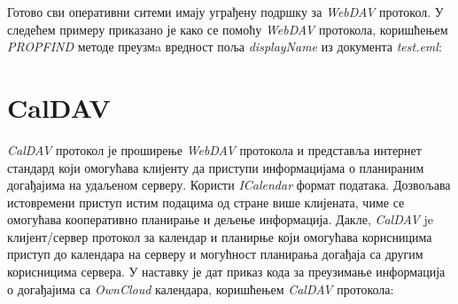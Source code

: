 Готово сви оперативни ситеми имају уграђену подршку за \textit{WebDAV} протокол. У следећем примеру приказано је како се помоћу \textit{WebDAV} протокола, коришћењем \textit{PROPFIND} методе преузмa вредност поља \textit{displayName} из документа \textit{test.eml}:


\section {CalDAV}

\textit{CalDAV} протокол је проширење \textit{WebDAV} протокола и представља  интернет стандард који омогућава клијенту да приступи информацијама о планираним догађајима на удаљеном серверу. Користи \textit{ICalendar}\cite{ical} формат података. Дозвољава истовремени приступ истим подацима од стране више клијената, чиме се омогућава кооперативно планирање и дељење информација. Дакле, \textit{CalDAV} je клијент/сервер протокол за календар и планирње који омогућава корисницима приступ до календара на серверу и могућност планирања догађаја са другим корисницима сервера. У наставку је дат приказ кода за преузимање информација о догађајима са \textit{OwnCloud} календара, коришћењем \textit{CalDAV} протокола:

